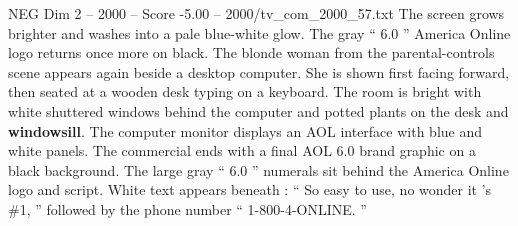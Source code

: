 \begin{textsample}{NEG Dim 2 – 2000 – Score -5.00 – 2000/tv\_com\_2000\_57.txt}
The screen grows brighter and washes into a pale blue-white glow.
The gray “ 6.0 ” America Online logo returns once more on black.
The blonde woman from the parental-controls scene appears again beside a desktop computer.
She is shown first facing forward, then seated at a wooden desk typing on a keyboard.
The room is bright with white shuttered windows behind the computer and potted plants on the desk and \textbf{windowsill}.
The computer monitor displays an AOL interface with blue and white panels.
The commercial ends with a final AOL 6.0 brand graphic on a black background.
The large gray “ 6.0 ” numerals sit behind the America Online logo and script.
White text appears beneath : “ So easy to use, no wonder it ’s \#1, ” followed by the phone number “ 1-800-4-ONLINE. ”

\end{textsample}
